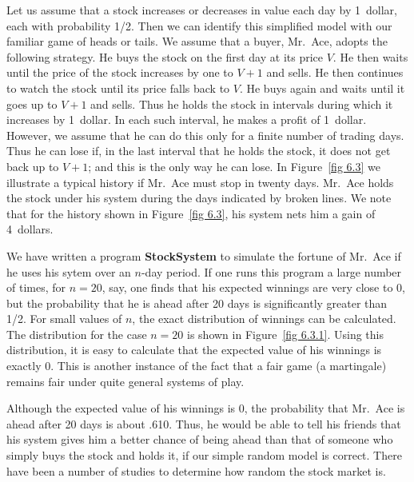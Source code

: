 \begin{example}\label{exam 6.12} Let us assume that a stock increases or decreases in
value each day by 1~dollar, each with probability 1/2.  Then we can identify this
simplified model with our familiar game of heads or tails.  We assume that a buyer,
Mr.\ Ace, adopts the following strategy.  He buys the stock on the first day at
its price $V$.  He then waits until the price of the stock increases by one to
$V + 1$ and sells.  He then continues to watch the stock until its price falls back
to $V$.  He buys again and waits until it goes up to $V + 1$ and sells.  Thus he
holds the stock in intervals during which it increases by 1~dollar.  In each such
interval, he makes a profit of 1~dollar.  However, we assume that he can do this only
for a finite number of trading days.  Thus he can lose if, in the last interval that
he holds the stock, it does not get back up to $V + 1$; and this is the only way he
can lose.  In Figure~\ref{fig 6.3} we illustrate a typical history if Mr.\ Ace must
stop in twenty days.
Mr.\ Ace holds the stock under his system during the days indicated by broken lines. 
We note that for the history shown in Figure~\ref{fig 6.3}, his system nets him a gain of 4~dollars.
\par
We have written a program {\bf StockSystem} to simulate the fortune of
Mr.\ Ace if he uses his sytem over an $n$-day period.  If one runs this program a large number of
times, for
$n = 20$, say, one finds that his expected winnings are very close to 0, but the probability that he
is ahead after 20 days is significantly greater than 1/2.  For small values of $n$, the exact
distribution of winnings can be calculated.  The distribution for the case $n = 20$ is shown in
Figure~\ref{fig 6.3.1}.  Using this distribution, it is easy to calculate that
the expected value of his winnings is exactly 0. This is another instance of the fact that a 
fair game (a martingale) remains fair under quite general systems of play.
\par
Although the expected value of his winnings is 0, the probability that Mr.\ Ace is ahead after 20
days is about .610.  Thus, he would be able to tell his friends that his
system gives him a better chance of being ahead than that of someone who simply buys the stock and
holds it, if our simple random model is correct.  There have been a number of studies
to determine how random the stock market is.  
\end{example}


